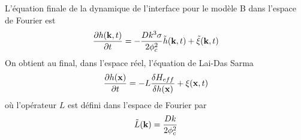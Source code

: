 L'équation finale de la dynamique de l'interface pour le modèle B dans l'espace de Fourier est
\begin{align}
    \frac{\partial h({\bf k},t)}{\partial t} = -\frac{Dk^3\sigma}{2\phi_c^2} \tilde h({\bf k},t) + \tilde \xi({\bf k},t)
    \label{modBFT}
\end{align}
On obtient au final, dans l'espace réel, l'équation de Lai-Das Sarma \cite{lai_kinetic_1991}
\begin{align}
    \frac{\partial h({\bf x})}{\partial t}= -L \frac{\delta H_{eff}}{\delta h ({\bf x})} + \xi({\bf x},t)
\end{align}
où l'opérateur $L$ est défini dans l'espace de Fourier par
\begin{align}
    \tilde L({\bf k}) = \frac{Dk}{2\phi_c^2}
    \label{op-mb}
\end{align}
%


